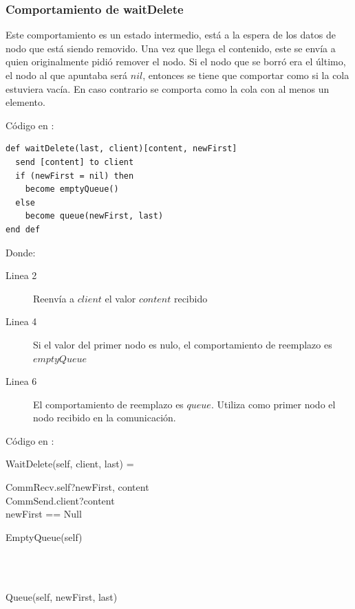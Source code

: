\subsubsection*{Comportamiento de waitDelete}
Este comportamiento es un estado intermedio, está a la espera de los datos de nodo que está siendo removido. Una vez que llega el contenido, este se envía a quien originalmente pidió remover el nodo. Si el nodo que se borró era el último, el nodo al que apuntaba será $nil$, entonces se tiene que comportar como si la cola estuviera vacía. En caso contrario se comporta como la cola con al menos un elemento.

Código en \SAL:

\begin{lstlisting}[language=sal, style=simple]
def waitDelete(last, client)[content, newFirst]
  send [content] to client
  if (newFirst = nil) then
    become emptyQueue()
  else
    become queue(newFirst, last)
end def
\end{lstlisting}

Donde: 

\begin{description}
 \item [Linea 2] Reenvía a $client$ el valor $content$ recibido
 \item [Linea 4] Si el valor del primer nodo es nulo, el comportamiento de reemplazo es $emptyQueue$
 \item [Linea 6] El comportamiento de reemplazo es $queue$. Utiliza como primer nodo el nodo recibido en la comunicación.
\end{description}

Código en \CSP:

\begin{process}
WaitDelete(self, client, last) = \\ \quad
  \begin{block}
  CommRecv.self?\langle newFirst, content \rangle \then \\ 
  CommSend.client?\langle content \rangle \then \\ 
  \If newFirst == Null \Then \\ \quad
    \begin{block}
      EmptyQueue(self)
    \end{block} \\ 
  \Then \\ \quad
    \begin{block}
    Queue(self, newFirst, last)
    \end{block}
  \end{block} 
\end{process}

